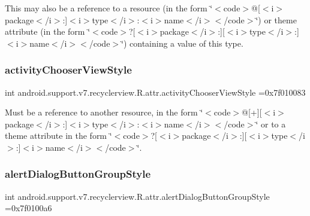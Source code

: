 This may also be a reference to a resource (in the form \char`\"{}$<$code$>$@\mbox{[}$<$i$>$package$<$/i$>$\+:\mbox{]}$<$i$>$type$<$/i$>$\+:$<$i$>$name$<$/i$>$$<$/code$>$\char`\"{}) or theme attribute (in the form \char`\"{}$<$code$>$?\mbox{[}$<$i$>$package$<$/i$>$\+:\mbox{]}\mbox{[}$<$i$>$type$<$/i$>$\+:\mbox{]}$<$i$>$name$<$/i$>$$<$/code$>$\char`\"{}) containing a value of this type. \mbox{\label{classandroid_1_1support_1_1v7_1_1recyclerview_1_1R_1_1attr_afead19f5f0dbd0c680d27f2374fc21a0}} 
\subsubsection{\texorpdfstring{activity\+Chooser\+View\+Style}{activityChooserViewStyle}}
{\footnotesize\ttfamily int android.\+support.\+v7.\+recyclerview.\+R.\+attr.\+activity\+Chooser\+View\+Style =0x7f010083\hspace{0.3cm}{\ttfamily [static]}}

Must be a reference to another resource, in the form \char`\"{}$<$code$>$@\mbox{[}+\mbox{]}\mbox{[}$<$i$>$package$<$/i$>$\+:\mbox{]}$<$i$>$type$<$/i$>$\+:$<$i$>$name$<$/i$>$$<$/code$>$\char`\"{} or to a theme attribute in the form \char`\"{}$<$code$>$?\mbox{[}$<$i$>$package$<$/i$>$\+:\mbox{]}\mbox{[}$<$i$>$type$<$/i$>$\+:\mbox{]}$<$i$>$name$<$/i$>$$<$/code$>$\char`\"{}. \mbox{\label{classandroid_1_1support_1_1v7_1_1recyclerview_1_1R_1_1attr_a8fba1b8e1ee565d09bd3d75d7732abbb}} 
\subsubsection{\texorpdfstring{alert\+Dialog\+Button\+Group\+Style}{alertDialogButtonGroupStyle}}
{\footnotesize\ttfamily int android.\+support.\+v7.\+recyclerview.\+R.\+attr.\+alert\+Dialog\+Button\+Group\+Style =0x7f0100a6\hspace{0.3cm}{\ttfamily [static]}}

